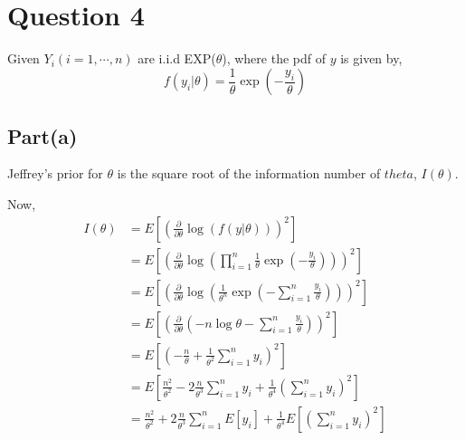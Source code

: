\documentclass[a4paper]{article}
\begin{document}
\section*{Question 4}
Given \(Y_i (i = 1,\cdots, n)\) are i.i.d EXP(\(\theta\)), where the pdf of \(y\) is given by,
\[f(y_i|\theta) = \frac{1}{\theta} \exp(-\frac{y_i}{\theta})\]

\subsection*{Part(a)}
Jeffrey's prior for \(\theta\) is the square root of the information number of \(theta\), \(I(\theta)\).

Now,
\begin{align*}
    I(\theta) &= E \left[\left(\frac{\partial}{\partial \theta } \log(f(y|\theta))\right)^2\right]\\
    &= E \left[\left(\frac{\partial}{\partial \theta } \log\left(\prod_{i=1}^{n}\frac{1}{\theta}\exp\left(-\frac{y_i}{\theta}\right)\right)\right)^2\right]\\
    &= E \left[\left(\frac{\partial}{\partial \theta } \log\left(\frac{1}{\theta^n}\exp\left(-\sum_{i=1}^{n}\frac{y_i}{\theta}\right)\right)\right)^2\right]\\
    &= E \left[\left(\frac{\partial}{\partial \theta }\left(-n\log\theta - \sum_{i=1}^{n}\frac{y_i}{\theta}\right) \right)^2\right]\\
    &= E \left[\left( -\frac{n}{\theta} + \frac{1}{\theta^2} \sum_{i=1}^{n}y_i\right)^2\right]\\
    &= E \left[\frac{n^2}{\theta^2} - 2 \frac{n}{\theta^3}\sum_{i=1}^{n}y_i + \frac{1}{\theta^4}\left(\sum_{i=1}^{n}y_i\right)^2\right]\\
    &= \frac{n^2}{\theta^2} + 2 \frac{n}{\theta^3}\sum_{i=1}^{n} E[y_i] + \frac{1}{\theta^4} E\left[\left(\sum_{i=1}^{n}y_i\right)^2\right]
\end{align*}
\end{document}
